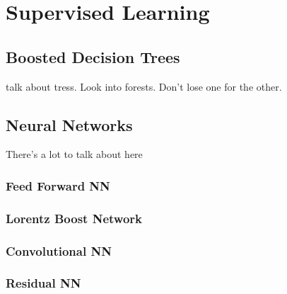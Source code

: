 \section{Supervised Learning}
\label{sec:supervised}

\subsection{Boosted Decision Trees}

talk about tress. Look into forests. Don't lose one for the other.

\subsection{Neural Networks}

There's a lot to talk about here

\subsubsection{Feed Forward NN}

\subsubsection{Lorentz Boost Network}

\subsubsection{Convolutional NN}

\subsubsection{Residual NN}

